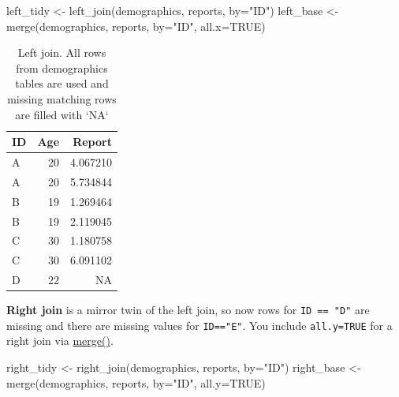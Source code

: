 \documentclass[
]{book}
\newenvironment{Shaded}{\begin{snugshade}}{\end{snugshade}}
\newcommand{\AttributeTok}[1]{\textcolor[rgb]{0.77,0.63,0.00}{#1}}
\newcommand{\ConstantTok}[1]{\textcolor[rgb]{0.00,0.00,0.00}{#1}}
\newcommand{\FunctionTok}[1]{\textcolor[rgb]{0.00,0.00,0.00}{#1}}
\newcommand{\NormalTok}[1]{#1}
\newcommand{\OtherTok}[1]{\textcolor[rgb]{0.56,0.35,0.01}{#1}}
\newcommand{\StringTok}[1]{\textcolor[rgb]{0.31,0.60,0.02}{#1}}
\begin{document}
\begin{Shaded}
\begin{Highlighting}[]
\NormalTok{left\_tidy }\OtherTok{\textless{}{-}} \FunctionTok{left\_join}\NormalTok{(demographics, reports, }\AttributeTok{by=}\StringTok{"ID"}\NormalTok{)}
\NormalTok{left\_base }\OtherTok{\textless{}{-}} \FunctionTok{merge}\NormalTok{(demographics, reports, }\AttributeTok{by=}\StringTok{"ID"}\NormalTok{, }\AttributeTok{all.x=}\ConstantTok{TRUE}\NormalTok{)}
\end{Highlighting}
\end{Shaded}

\begin{table}

\caption{\label{tab:unnamed-chunk-185}Left join. All rows from demographics tables are used and missing matching rows are filled with `NA`}
\centering
\begin{tabular}[t]{l|r|r}
\hline
ID & Age & Report\\
\hline
A & 20 & 4.067210\\
\hline
A & 20 & 5.734844\\
\hline
B & 19 & 1.269464\\
\hline
B & 19 & 2.119045\\
\hline
C & 30 & 1.180758\\
\hline
C & 30 & 6.091102\\
\hline
D & 22 & NA\\
\hline
\end{tabular}
\end{table}

\textbf{Right join} is a mirror twin of the left join, so now rows for \texttt{ID\ ==\ "D"} are missing and there are missing values for \texttt{ID=="E"}. You include \texttt{all.y=TRUE} for a right join via \href{https://stat.ethz.ch/R-manual/R-devel/library/base/html/merge.html}{merge()}.

\begin{Shaded}
\begin{Highlighting}[]
\NormalTok{right\_tidy }\OtherTok{\textless{}{-}} \FunctionTok{right\_join}\NormalTok{(demographics, reports, }\AttributeTok{by=}\StringTok{"ID"}\NormalTok{) }
\NormalTok{right\_base }\OtherTok{\textless{}{-}} \FunctionTok{merge}\NormalTok{(demographics, reports, }\AttributeTok{by=}\StringTok{"ID"}\NormalTok{, }\AttributeTok{all.y=}\ConstantTok{TRUE}\NormalTok{)}
\end{Highlighting}
\end{Shaded}
\end{document}
